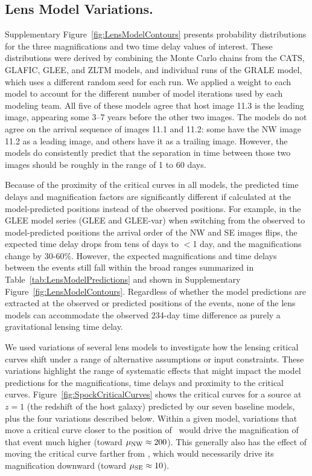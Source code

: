 \subsection{Lens Model Variations.}\label{sec:LensModelVariations}

Supplementary Figure~\ref{fig:LensModelContours} presents probability
distributions for the three magnifications and two time delay values
of interest.  These distributions were derived by combining the Monte
Carlo chains from the CATS, GLAFIC, GLEE, and ZLTM models, and
individual runs of the GRALE model, which uses a different random seed
for each run.  We applied a weight to each model to account for the
different number of model iterations used by each modeling team. All
five of these models agree that host image 11.3 is the leading image,
appearing some 3--7 years before the other two images.  The models do
not agree on the arrival sequence of images 11.1 and 11.2: some have
the NW image 11.2 as a leading image, and others have it as a trailing
image.  However, the models do consistently predict that the
separation in time between those two images should be roughly in the
range of 1 to 60 days.

Because of the proximity of the critical curves in all models, the
predicted time delays and magnification factors are significantly
different if calculated at the model-predicted positions instead of
the observed positions.  For example, in the GLEE model series (GLEE
and GLEE-var) when switching from the observed to model-predicted
positions the arrival order of the NW and SE images flips, the
expected time delay drops from tens of days to $<$1 day, and the
magnifications change by 30-60\%.  However, the expected
magnifications and time delays between the events still fall within
the broad ranges summarized in Table~\ref{tab:LensModelPredictions}
and shown in Supplementary Figure~\ref{fig:LensModelContours}.  Regardless of
whether the model predictions are extracted at the observed or
predicted positions of the \spock events, none of the lens models can
accommodate the observed 234-day time difference as purely a
gravitational lensing time delay.

We used variations of several lens models to investigate how the
lensing critical curves shift under a range of alternative assumptions
or input constraints.  These variations highlight the range of
systematic effects that might impact the model predictions for the
\spock magnifications, time delays and proximity to the critical
curves.  Figure~\ref{fig:SpockCriticalCurves} shows the critical
curves for a source at $z=1$ (the redshift of the \spock host galaxy)
predicted by our seven baseline models, plus the four variations
described below.  Within a given model, variations that move a
critical curve closer to the position of \spockone\ would drive the
magnification of that event much higher (toward $\mu_{\rm
  NW}\approx200$).  This generally also has the effect of moving the
critical curve farther from \spocktwo, which would necessarily drive
its magnification downward (toward $\mu_{\rm SE}\approx10$).

